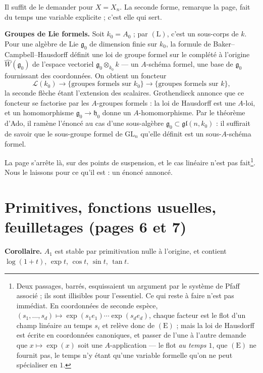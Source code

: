 \documentclass[11pt,a4paper]{article}
\begin{document}
Il suffit de le demander pour $X = X_n$. La seconde forme, remarque la page,
fait du temps une variable explicite ; c'est elle qui sert.

\textbf{Groupes de Lie formels.} Soit $k_0 = A_0$ ; par $(\mathrm{L})$, c'est un
sous-corps de $k$. Pour une algèbre de Lie $\mathfrak{g}_0$ de dimension finie
sur $k_0$, la formule de Baker--Campbell--Hausdorff définit une loi de groupe
formel sur le complété à l'origine $\widehat{W}(\mathfrak{g}_0)$ de l'espace
vectoriel $\mathfrak{g}_0 \otimes_{k_0} k$ — un $A$-schéma formel, une base de
$\mathfrak{g}_0$ fournissant des coordonnées. On obtient un foncteur
\[
  \mathcal{L}(k_0) \longrightarrow \{\text{groupes formels sur } k_0\}
  \longrightarrow \{\text{groupes formels sur } k\},
\]
la seconde flèche étant l'extension des scalaires. Grothendieck annonce que ce
foncteur se factorise par les $A$-groupes formels : la loi de Hausdorff est
une $A$-loi, et un homomorphisme $\mathfrak{g}_0 \to \mathfrak{h}_0$ donne un
$A$-homomorphisme. Par le théorème d'Ado, il ramène l'énoncé au cas d'une
sous-algèbre $\mathfrak{g}_0 \subset \mathfrak{gl}(n, k_0)$ : il suffirait de
savoir que le sous-groupe formel de $\mathrm{GL}_n$ qu'elle définit est un
sous-$A$-schéma formel.

La page s'arrête là, sur des points de suspension, et le cas linéaire n'est pas
fait\footnote{Deux passages, barrés, esquissaient un argument par le système
de Pfaff associé ; ils sont illisibles pour l'essentiel. Ce qui reste à faire
n'est pas immédiat. En coordonnées de seconde espèce,
$(s_1, \ldots, s_d) \mapsto \exp(s_1 e_1) \cdots \exp(s_d e_d)$, chaque facteur
est le flot d'un champ linéaire au temps $s_i$ et relève donc de
$(\mathrm{E})$ ; mais la loi de Hausdorff est écrite en coordonnées canoniques,
et passer de l'une à l'autre demande que $x \mapsto \exp(x)$ soit une
$A$-application — le flot \emph{au temps $1$}, que $(\mathrm{E})$ ne fournit
pas, le temps n'y étant qu'une variable formelle qu'on ne peut spécialiser
en $1$.}. Nous le laissons pour ce qu'il est : un énoncé annoncé.

\section*{Primitives, fonctions usuelles, feuilletages (pages 6 et 7)}

\textbf{Corollaire.} $A_1$ est stable par primitivation nulle à l'origine, et
contient $\log(1 + t)$, $\exp t$, $\cos t$, $\sin t$, $\tan t$.
\end{document}
